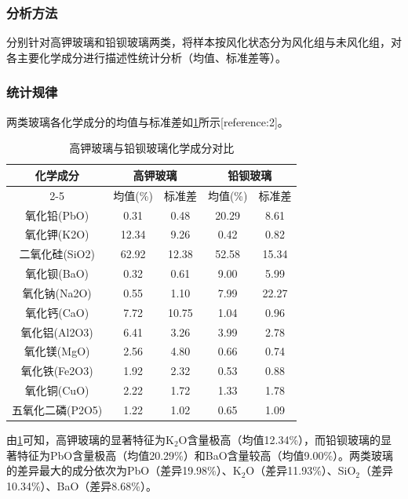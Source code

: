 \documentclass{cumcmthesis}
\begin{document}
\subsubsection{分析方法}
分别针对高钾玻璃和铅钡玻璃两类，将样本按风化状态分为风化组与未风化组，对各主要化学成分进行描述性统计分析（均值、标准差等）。

\subsubsection{统计规律}

两类玻璃各化学成分的均值与标准差如\cref{tab:composition_stats}所示[reference:2]。

\begin{table}[!htbp]
    \centering
    \caption{高钾玻璃与铅钡玻璃化学成分对比}
    \label{tab:composition_stats}
    \begin{tabular}{c|c|c|c|c}
        \toprule[1.5pt]
        \multirow{2}{*}{化学成分} & \multicolumn{2}{c|}{高钾玻璃} & \multicolumn{2}{c}{铅钡玻璃} \\
        \cline{2-5}
         & 均值(\%) & 标准差 & 均值(\%) & 标准差 \\
        \midrule[1pt]
        氧化铅(PbO) & 0.31 & 0.48 & 20.29 & 8.61 \\
        氧化钾(K2O) & 12.34 & 9.26 & 0.42 & 0.82 \\
        二氧化硅(SiO2) & 62.92 & 12.38 & 52.58 & 15.34 \\
        氧化钡(BaO) & 0.32 & 0.61 & 9.00 & 5.99 \\
        氧化钠(Na2O) & 0.55 & 1.10 & 7.99 & 22.27 \\
        氧化钙(CaO) & 7.72 & 10.75 & 1.04 & 0.96 \\
        氧化铝(Al2O3) & 6.41 & 3.26 & 3.99 & 2.78 \\
        氧化镁(MgO) & 2.56 & 4.80 & 0.66 & 0.74 \\
        氧化铁(Fe2O3) & 1.92 & 2.32 & 0.53 & 0.88 \\
        氧化铜(CuO) & 2.22 & 1.72 & 1.33 & 1.78 \\
        五氧化二磷(P2O5) & 1.22 & 1.02 & 0.65 & 1.09 \\
        \bottomrule[1.5pt]
    \end{tabular}
\end{table}

由\cref{tab:composition_stats}可知，高钾玻璃的显著特征为K$_2$O含量极高（均值12.34\%），而铅钡玻璃的显著特征为PbO含量极高（均值20.29\%）和BaO含量较高（均值9.00\%）。两类玻璃的差异最大的成分依次为PbO（差异19.98\%）、K$_2$O（差异11.93\%）、SiO$_2$（差异10.34\%）、BaO（差异8.68\%）。
\end{document}
